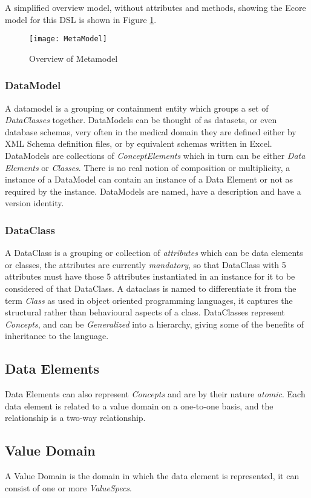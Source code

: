 A simplified overview model, without attributes and methods, showing the Ecore model for this DSL is shown in Figure \ref{fig:mcSimplifiedOverview}.
\begin{figure}[here]
	\texttt{[image: MetaModel]}
	\caption{Overview of Metamodel} 
	\label{fig:mcSimplifiedOverview}
\end{figure}

\subsubsection{DataModel}
A datamodel is a grouping or containment entity which groups a set of \emph{DataClasses} together. DataModels can be thought of as datasets, or even database schemas, very often in the medical domain they are defined either by XML Schema definition files, or by equivalent schemas written in Excel. 
DataModels are collections of \emph{ConceptElements} which in turn can be either \emph{Data Elements} or \emph{Classes}. There is no real notion of composition or multiplicity, a instance of a DataModel can contain an instance of a Data Element or not as required by the instance.  DataModels are named, have a description and have a version identity.
\subsubsection{DataClass}
A DataClass is a grouping or collection of \emph{attributes} which can be data elements or classes, the attributes are currently \emph{mandatory}, so that DataClass with 5 attributes must have those 5 attributes instantiated in an instance for it to be considered of that DataClass. A dataclass is named to differentiate it from the term \emph{Class} as used in object oriented programming languages, it captures the structural rather than behavioural aspects of a class.  DataClasses represent \emph{Concepts}, and can be \emph{Generalized} into a hierarchy, giving some of the benefits of inheritance to the language.  
\subsection{Data Elements} 
Data Elements can also represent \emph{Concepts} and are by their nature \emph{atomic}.  Each data element is related to a value domain on a one-to-one basis, and the relationship is a two-way relationship.
\subsection{Value Domain}
A Value Domain is the domain in which the data element is represented, it can consist of one or more \emph{ValueSpecs}.
